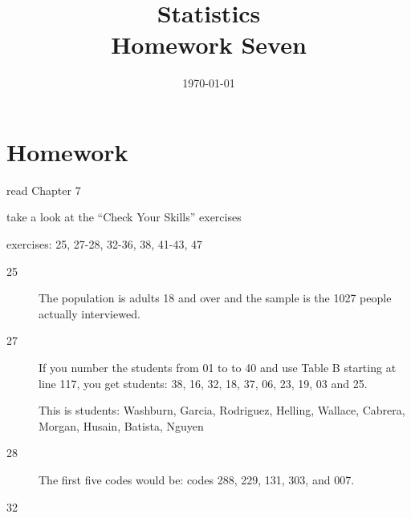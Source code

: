 \documentclass[letterpaper]{exam}
\title{Statistics \\ Homework Seven}
\date{\today}
\author{}
\begin{document}
  \maketitle

  \section{Homework}
    \begin{itemize*}
      \item read Chapter 7 
      \item take a look at the ``Check Your Skills'' exercises
      \item exercises: 25, 27-28, 32-36, 38, 41-43, 47
    \end{itemize*}

  \ifprintanswers
    \begin{description}

      \item[25] The population is adults 18 and over and the sample is the 1027
        people actually interviewed.

      \item[27] If you number the students from 01 to to 40 and use Table B
        starting at line 117, you get students: 38, 16, 32, 18, 37, 06, 23,
        19, 03 and 25.

        This is students: Washburn, Garcia, Rodriguez, Helling, Wallace,
        Cabrera, Morgan, Husain, Batista, Nguyen

      \item[28] The first five codes would be: codes 288, 229, 131, 303, and 007.

      \item[32] 


\end{description}
\end{document}
